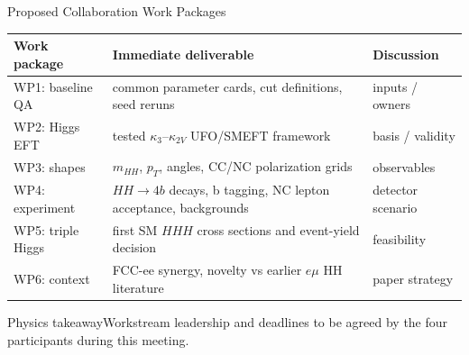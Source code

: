 \documentclass[aspectratio=1610,english]{beamer}
\newcommand{\src}[1]{\vfill{\par\color{black!65}\fontsize{6.4}{7.4}\selectfont\emph{Source:} #1\par}}
\newcommand{\key}[1]{\begin{alertblock}{Physics takeaway}\scriptsize #1\end{alertblock}}
\begin{document}
\begin{frame}[t]{Proposed Collaboration Work Packages}
\footnotesize

\begin{center}\setlength{\tabcolsep}{4pt}\renewcommand{\arraystretch}{1.03}
\begin{tabular}{p{2.25cm}p{6.0cm}p{2.5cm}}\toprule
Work package & Immediate deliverable & Discussion\\\midrule
WP1: baseline QA & common parameter cards, cut definitions, seed reruns & inputs / owners\\
WP2: Higgs EFT & tested $\kappa_3$--$\kappa_{2V}$ UFO/SMEFT framework & basis / validity\\
WP3: shapes & $m_{HH}$, $p_T$, angles, CC/NC polarization grids & observables\\
WP4: experiment & $HH\to4b$ decays, b tagging, NC lepton acceptance, backgrounds & detector scenario\\
WP5: triple Higgs & first SM $HHH$ cross sections and event-yield decision & feasibility\\
WP6: context & FCC-ee synergy, novelty vs earlier $e\mu$ HH literature & paper strategy\\\bottomrule
\end{tabular}\end{center}
\key{Workstream leadership and deadlines to be agreed by the four participants during this meeting.}

\end{frame}
\end{document}
